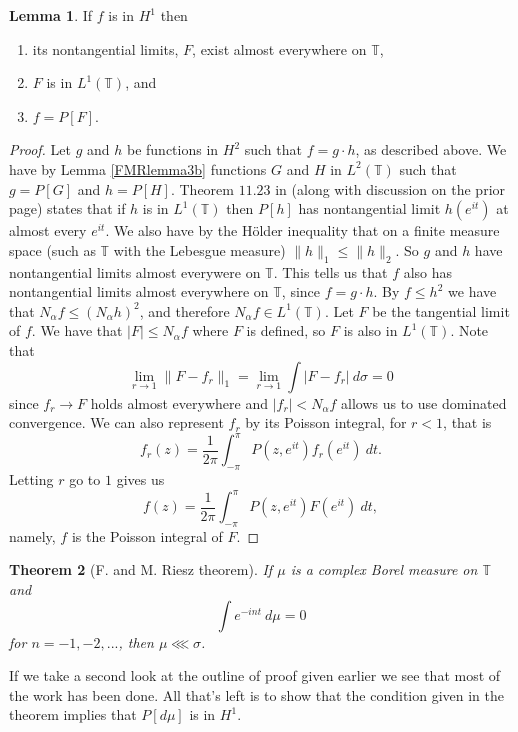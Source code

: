 \documentclass[a4paper,12pt,twoside,BCOR=10mm]{scrbook}
\newtheorem{theorem}{Theorem}[section]
\theoremstyle{definition}
\theoremstyle{definition}
\newtheorem{lemma}[theorem]{Lemma}
\theoremstyle{definition}
\begin{document}
\begin{lemma}
\label{FMRlemma2}
If $f$ is in $H^1$ then
\begin{enumerate}
\item \label{p1}
its nontangential limits, $F$, exist almost everywhere on $\mathbb{T}$,
\item \label{p2}
$F$ is in $L^1(\mathbb{T})$, and
\item \label{p3}
$f = P[F]$.
\end{enumerate}
\end{lemma}
\begin{proof}
Let $g$ and $h$ be functions in $H^2$ such that $f = g \cdot h$, as described above.
We have by Lemma \ref{FMRlemma3b} functions $G$ and $H$ in $L^2(\mathbb{T})$ such that $g = P[G]$ and $h = P[H]$.
Theorem $11.23$ in \citep{rudin2} (along with discussion on the prior page) states that if $h$ is in $L^1(\mathbb{T})$ then $P[h]$ has nontangential limit $h(e^{it})$ at almost every $e^{it}$.
We also have by the Hölder inequality that on a finite measure space (such as $\mathbb{T}$ with the Lebesgue measure) $\|h\|_1 \leq \|h\|_2$.
So $g$ and $h$ have nontangential limits almost everywere on $\mathbb{T}$.
This tells us that $f$ also has nontangential limits almost everywhere on $\mathbb{T}$, since $f = g \cdot h$.
By $f \leq h^2$ we have that $N_{\alpha}f \leq (N_{\alpha}h)^2$, and therefore $N_{\alpha}f \in L^1(\mathbb{T})$.
Let $F$ be the tangential limit of $f$.
We have that $|F| \leq N_{\alpha}f$ where $F$ is defined, so $F$ is also in $L^1(\mathbb{T})$.
Note that
\[
	\lim_{r \rightarrow 1} \|F - f_r\|_1 = \lim_{r \rightarrow 1} \int |F - f_r|\ d\sigma = 0
\]
since $f_r \rightarrow F$ holds almost everywhere and $|f_r| < N_{\alpha}f$ allows us to use dominated convergence.
We can also represent $f_r$ by its Poisson integral, for $r < 1$, that is
\[
	f_r(z) = \frac{1}{2\pi} \int_{-\pi}^{\pi} P(z, e^{it})f_r(e^{it})\ dt.
\]
Letting $r$ go to $1$ gives us
\[
	f(z) = \frac{1}{2\pi} \int_{-\pi}^{\pi} P(z, e^{it})F(e^{it})\ dt,
\]
namely, $f$ is the Poisson integral of $F$.
\end{proof}
\begin{theorem}[F. and M. Riesz theorem]
If $\mu$ is a complex Borel measure on $\mathbb{T}$ and
\[
	\int e^{-int}\ d\mu = 0
\]
for $n = -1, -2, ...$, then $\mu \lll \sigma$.
\end{theorem}
If we take a second look at the outline of proof given earlier we see that most of the work has been done.
All that's left is to show that the condition given in the theorem implies that $P[d\mu]$ is in $H^1$.
\end{document}
